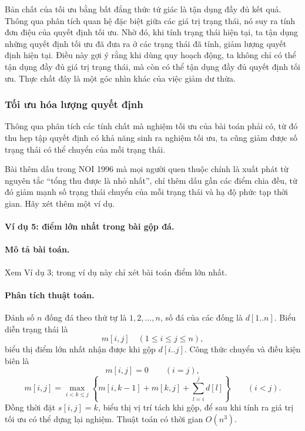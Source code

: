 \documentclass[11pt]{article}
\begin{document}
Bản chất của tối ưu bằng bất đẳng thức tứ giác là tận dụng đầy đủ kết quả.
Thông qua phân tích quan hệ đặc biệt giữa các giá trị trạng thái, nó suy ra
tính đơn điệu của quyết định tối ưu. Nhờ đó, khi tính trạng thái hiện tại, ta
tận dụng những quyết định tối ưu đã đưa ra ở các trạng thái đã tính, giảm
lượng quyết định hiện tại. Điều này gợi ý rằng khi dùng quy hoạch động, ta
không chỉ có thể tận dụng đầy đủ giá trị trạng thái, mà còn có thể tận dụng
đầy đủ quyết định tối ưu. Thực chất đây là một góc nhìn khác của việc giảm
dư thừa.

\subsubsection{Tối ưu hóa lượng quyết định}

Thông qua phân tích các tính chất mà nghiệm tối ưu của bài toán phải có, từ
đó thu hẹp tập quyết định có khả năng sinh ra nghiệm tối ưu, ta cũng giảm
được số trạng thái có thể chuyển của mỗi trạng thái.

Bài thêm dấu trong NOI 1996 mà mọi người quen thuộc chính là xuất phát từ
nguyên tắc ``tổng thu được là nhỏ nhất'', chỉ thêm dấu gần các điểm chia đều,
từ đó giảm mạnh số trạng thái chuyển của mỗi trạng thái và hạ độ phức tạp
thời gian. Hãy xét thêm một ví dụ.

\paragraph{Ví dụ 5: điểm lớn nhất trong bài gộp đá.}

\paragraph{Mô tả bài toán.}
Xem Ví dụ 3; trong ví dụ này chỉ xét bài toán điểm lớn nhất.

\paragraph{Phân tích thuật toán.}
Đánh số \(n\) đống đá theo thứ tự là \(1,2,\ldots,n\), số đá của các đống là
\(d[1..n]\). Biểu diễn trạng thái là
\[
  m[i,j]\quad (1\le i\le j\le n),
\]
biểu thị điểm lớn nhất nhận được khi gộp \(d[i..j]\). Công thức chuyển và
điều kiện biên là
\[
  m[i,j]=0\qquad (i=j),
\]
\[
  m[i,j]=\max_{i<k\le j}
  \left\{m[i,k-1]+m[k,j]+\sum_{l=i}^{j}d[l]\right\}
  \qquad (i<j).
\]
Đồng thời đặt \(s[i,j]=k\), biểu thị vị trí tách khi gộp, để sau khi tính ra
giá trị tối ưu có thể dựng lại nghiệm. Thuật toán có thời gian \(O(n^3)\).
\end{document}
